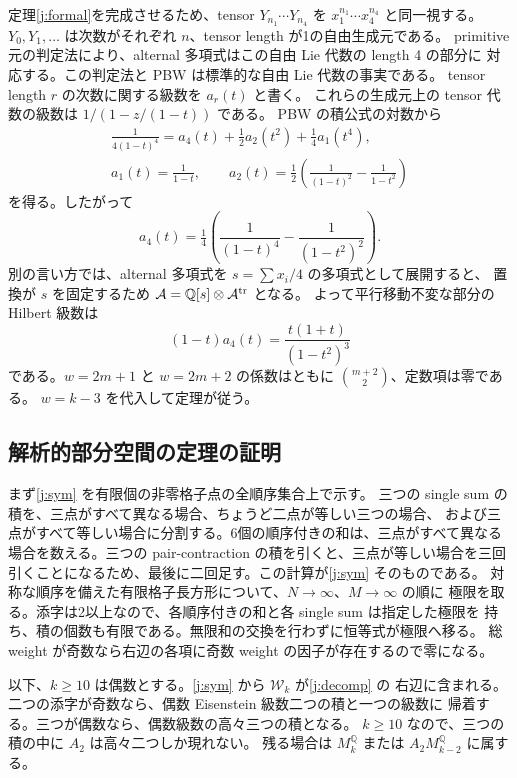 \documentclass[12pt]{amsart}
\theoremstyle{definition}
\theoremstyle{remark}
\numberwithin{equation}{section}
\newcommand{\Q}{\mathbb{Q}}
\newcommand{\WW}{\mathcal W}
\newcommand{\Al}{\mathcal A}
\numberwithin{equation}{section}
\begin{document}
定理\ref{j:formal}を完成させるため、tensor
$Y_{n_1}\cdots Y_{n_4}$ を $x_1^{n_1}\cdots x_4^{n_4}$ と同一視する。
$Y_0,Y_1,\ldots$ は次数がそれぞれ $n$、tensor length が1の自由生成元である。
primitive 元の判定法により、alternal 多項式はこの自由 Lie 代数の length 4 の部分に
対応する。この判定法と PBW は標準的な自由 Lie 代数の事実である\cite{j-reutenauer}。
tensor length $r$ の次数に関する級数を $a_r(t)$ と書く。
これらの生成元上の tensor 代数の級数は $1/(1-z/(1-t))$ である。
PBW の積公式の対数から
\[
 \begin{gathered}
 \frac{1}{4(1-t)^4}=a_4(t)+\tfrac12a_2(t^2)+\tfrac14a_1(t^4),
 \\ a_1(t)=\frac1{1-t},\qquad
 a_2(t)=\tfrac12\left(\frac1{(1-t)^2}-\frac1{1-t^2}\right)
 \end{gathered}
\]
を得る。したがって
\[
 a_4(t)=\tfrac14\left(\frac1{(1-t)^4}-\frac1{(1-t^2)^2}\right).
\]
別の言い方では、alternal 多項式を $s=\sum x_i/4$ の多項式として展開すると、
置換が $s$ を固定するため $\Al=\Q[s]\otimes\Al^{\rm tr}$ となる。
よって平行移動不変な部分の Hilbert 級数は
\[
 (1-t)a_4(t)=\frac{t(1+t)}{(1-t^2)^3}
\]
である。$w=2m+1$ と $w=2m+2$ の係数はともに $\binom{m+2}{2}$、定数項は零である。
$w=k-3$ を代入して定理が従う。

\subsection{解析的部分空間の定理の証明}
まず\eqref{j:sym} を有限個の非零格子点の全順序集合上で示す。
三つの single sum の積を、三点がすべて異なる場合、ちょうど二点が等しい三つの場合、
および三点がすべて等しい場合に分割する。6個の順序付きの和は、三点がすべて異なる
場合を数える。三つの pair-contraction の積を引くと、三点が等しい場合を三回
引くことになるため、最後に二回足す。この計算が\eqref{j:sym} そのものである。
対称な順序を備えた有限格子長方形について、$N\to\infty$、$M\to\infty$ の順に
極限を取る。添字は2以上なので、各順序付きの和と各 single sum は指定した極限を
持ち、積の個数も有限である。無限和の交換を行わずに恒等式が極限へ移る。
総 weight が奇数なら右辺の各項に奇数 weight の因子が存在するので零になる。

以下、$k\ge10$ は偶数とする。\eqref{j:sym} から $\WW_k$ が\eqref{j:decomp} の
右辺に含まれる。二つの添字が奇数なら、偶数 Eisenstein 級数二つの積と一つの級数に
帰着する。三つが偶数なら、偶数級数の高々三つの積となる。
$k\ge10$ なので、三つの積の中に $A_2$ は高々二つしか現れない。
残る場合は $M_k^{\Q}$ または $A_2M_{k-2}^{\Q}$ に属する。
\end{document}
